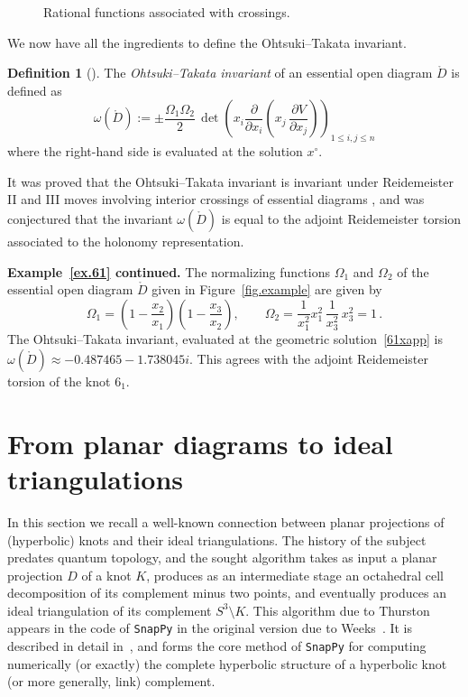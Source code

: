 \documentclass[12pt,reqno]{amsart}
\theoremstyle{definition}
\newtheorem{definition}[theorem]{Definition}
\renewcommand{\Ddot}{\mathring{D}}
\begin{document}
\begin{figure}[htpb!]

\caption{Rational functions associated with crossings.}
\label{fig.omega2}
\end{figure}

We now have all the ingredients to define the Ohtsuki--Takata invariant.

\begin{definition}[\cite{OT2015}]
The \emph{Ohtsuki--Takata invariant} of an essential open diagram $\Ddot$
is defined as
\begin{equation}
\label{eqn.OT}
\omega(\Ddot) := \pm \frac{\Omega_1 \Omega_2}{2} \, \det \left (
x_i \dfrac{\partial}{\partial x_i} \left(x_j\, \dfrac{\partial V}{ \partial x_j}
\right)\right)_{1 \leq i,j \leq n} 
\end{equation}
where the right-hand side is evaluated at the solution $x^\circ$. 
\end{definition}

It was proved that the Ohtsuki--Takata invariant is invariant under Reidemeister
II and III moves involving interior crossings of essential diagrams
\cite[Prop.4.3]{OT2015}, and was conjectured that the invariant $\omega(\Ddot)$ is
equal  to the adjoint Reidemeister torsion associated to the holonomy representation.

\noindent
{\bf Example~\ref{ex.61} continued.}
The normalizing functions $\Omega_1$ and $\Omega_2$  of the essential open diagram
$\Ddot$ given in Figure~\ref{fig.example}  are given by
\begin{equation*}
\Omega_1 =
\left(1-\frac{x_2}{x_1}\right)
\left( 1-\frac{x_3}{x_2}\right), \qquad
\Omega_2  =  \frac{1}{x_1^2} x_1^2 \, \dfrac{1}{x_3^2} \, x_3^2 = 1 \,.
\end{equation*}
The Ohtsuki--Takata invariant, evaluated at the geometric solution~\eqref{61xapp}
is $\omega(\Ddot) \approx  -0.487465 - 1.738045 i$. This agrees with
the adjoint Reidemeister torsion of the knot $6_1$.


\section{From planar diagrams to ideal triangulations}
\label{sec.octa}

In this section we recall a well-known connection between planar projections
of (hyperbolic) knots and their ideal triangulations. The history of the subject
predates quantum topology, and the sought algorithm 
takes as input a planar projection $D$ of a knot $K$, produces as an intermediate
stage an octahedral cell decomposition of its complement minus two points, and
eventually produces an ideal triangulation  of its complement $S^3 \setminus K$.
This algorithm due to Thurston appears in the code of \texttt{SnapPy} in the original
version due to Weeks~\cite{snappy}.
It is described in detail in~\cite{Weeks}, and forms the core  method of
\texttt{SnapPy} for computing numerically (or exactly) the complete hyperbolic
structure of a hyperbolic knot (or more generally, link) complement. 
\end{document}
